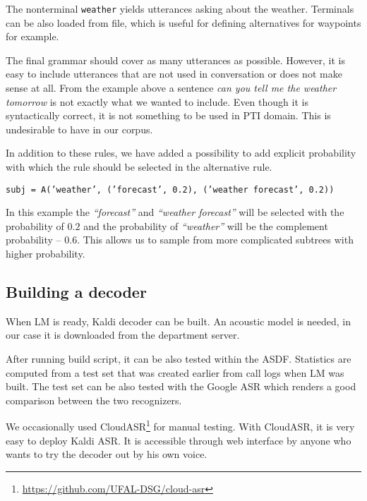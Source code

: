 The nonterminal \texttt{weather} yields utterances asking about the weather.
Terminals can be also loaded from file, which is useful for defining alternatives for waypoints for example.

The final grammar should cover as many utterances as possible.
However, it is easy to include utterances that are not used in conversation or does not make sense at all.
From the example above a sentence \textit{can you tell me the weather tomorrow} is not exactly what we wanted to include.
Even though it is syntactically correct, it is not something to be used in \ac{PTI} domain.
This is undesirable to have in our corpus.


In addition to these rules, we have added a possibility to add explicit probability with which the rule should be selected in the alternative rule.

\begin{flushleft}
\texttt{subj = A('weather', ('forecast', 0.2), ('weather forecast', 0.2))}
\end{flushleft}

\noindent In this example the \textit{``forecast''} and \textit{``weather forecast''} will be selected with the probability of $0.2$ and the probability of \textit{``weather''} will be the complement probability -- $0.6$.
This allows us to sample from more complicated subtrees with higher probability.

\subsection{Building a decoder}

When \ac{LM} is ready, Kaldi decoder can be built.
An acoustic model is needed, in our case it is downloaded from the department server.

After running build script, it can be also tested within the \ac{ASDF}.
Statistics are computed from a test set that was created earlier from call logs when \ac{LM} was built.
The test set can be also tested with the Google \ac{ASR} which renders a good comparison between the two recognizers.

We occasionally used CloudASR\footnote{\url{https://github.com/UFAL-DSG/cloud-asr}} for manual testing.
With CloudASR, it is very easy to deploy Kaldi \ac{ASR}.
It is accessible through web interface by anyone who wants to try the decoder out by his own voice.
